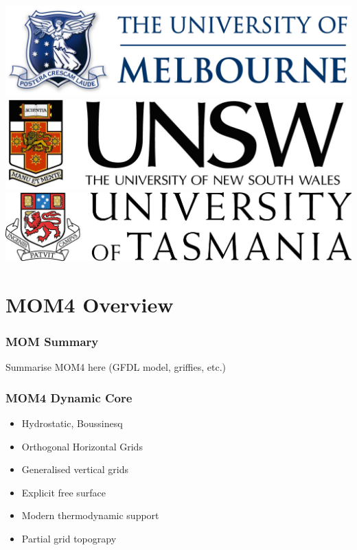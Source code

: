 \documentclass[red]{beamer}
\begin{document}
\begin{frame}
\begin{textblock*}{\textwidth}
        \includegraphics[height=0.061\textheight]{umelb_logo.png}
        \hspace{0.02\textwidth}
        \includegraphics[height=0.061\textheight]{unsw_logo.jpg}
        \hspace{0.02\textwidth}
        \includegraphics[height=0.061\textheight]{utas_logo.jpg}
    \end{textblock*}
\end{frame}

\section[Overview]{MOM4 Overview}

\begin{frame}
    \frametitle{MOM Summary}

    Summarise MOM4 here (GFDL model, griffies, etc.)
\end{frame}

\begin{frame}
    \frametitle{MOM4 Dynamic Core}
    
    \begin{itemize}
        \item Hydrostatic, Boussinesq
        \item Orthogonal Horizontal Grids
        \item Generalised vertical grids
		\item Explicit free surface
		\item Modern thermodynamic support
        \item Partial grid topograpy
    \end{itemize}
\end{frame}
\end{document}

